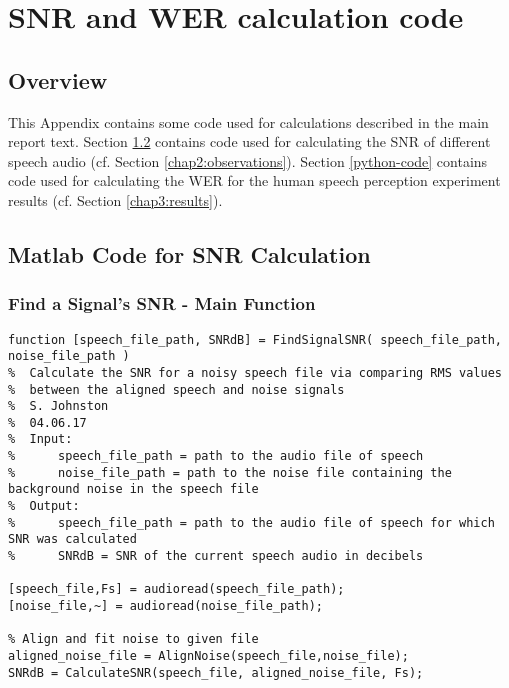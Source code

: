 % 
% 
% 
\chapter{SNR and WER calculation code}\label{appendixB}


\section{Overview}

This Appendix contains some code used for calculations described in the main report text.  Section \ref{matlab-code} contains code used for calculating the SNR of different speech audio (cf. Section \ref{chap2:observations}).  Section \ref{python-code} contains code used for calculating the WER for the human speech perception experiment results (cf. Section \ref{chap3:results}).

\section{Matlab Code for SNR Calculation}\label{matlab-code}

\subsection{Find a Signal's SNR - Main Function}

\begin{lstlisting}
function [speech_file_path, SNRdB] = FindSignalSNR( speech_file_path, noise_file_path )
%  Calculate the SNR for a noisy speech file via comparing RMS values
%  between the aligned speech and noise signals
%  S. Johnston
%  04.06.17
%  Input:
%      speech_file_path = path to the audio file of speech
%      noise_file_path = path to the noise file containing the background noise in the speech file
%  Output:
%      speech_file_path = path to the audio file of speech for which SNR was calculated
%      SNRdB = SNR of the current speech audio in decibels

[speech_file,Fs] = audioread(speech_file_path);
[noise_file,~] = audioread(noise_file_path);

% Align and fit noise to given file
aligned_noise_file = AlignNoise(speech_file,noise_file);
SNRdB = CalculateSNR(speech_file, aligned_noise_file, Fs);
\end{lstlisting}


